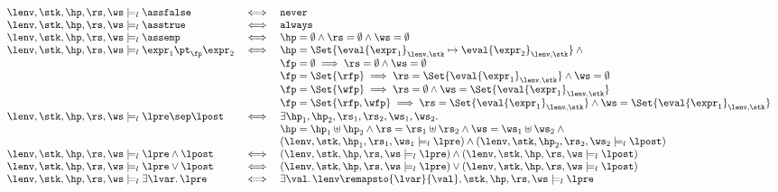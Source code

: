 \[
    \begin{array}{l c l}
        \lenv, \stk, \hp, \rs, \ws \models_{l} \assfalse & \iff & \texttt{never} \\
        \lenv, \stk, \hp, \rs, \ws \models_{l} \asstrue & \iff & \texttt{always} \\
        \lenv, \stk, \hp, \rs, \ws \models_{l} \assemp & \iff & \hp = \emptyset \land \rs = \emptyset \land \ws = \emptyset \\
        \lenv, \stk, \hp, \rs, \ws \models_{l} \expr_{1} \pt_{\fp} \expr_{2} & \iff & \hp = \Set{\eval{\expr_{1}}_{\lenv, \stk} \mapsto \eval{\expr_{2}}_{\lenv, \stk}} \land {} \\
                                                                             & & \fp = \emptyset \implies \rs = \emptyset \land \ws = \emptyset \\
                                                                             & & \fp = \Set{\rfp} \implies \rs = \Set{\eval{\expr_{1}}_{\lenv, \stk}} \land \ws = \emptyset \\
                                                                             & & \fp = \Set{\wfp} \implies \rs = \emptyset \land \ws = \Set{\eval{\expr_{1}}_{\lenv, \stk}}  \\
                                                                             & & \fp = \Set{\rfp,\wfp} \implies \rs = \Set{\eval{\expr_{1}}_{\lenv, \stk}} \land \ws = \Set{\eval{\expr_{1}}_{\lenv, \stk}}  \\
        \lenv, \stk, \hp, \rs, \ws \models_{l} \lpre \sep \lpost & \iff &  \exists \hp_{1}, \hp_{2}, \rs_{1}, \rs_{2}, \ws_{1}, \ws_{2} \ldotp \\
                                                                 & & \hp = \hp_{1} \uplus \hp_{2} \land \rs = \rs_{1} \uplus \rs_{2} \land \ws = \ws_{1} \uplus \ws_{2} \land {} \\
                                                                 & &  ( \lenv, \stk, \hp_{1}, \rs_{1}, \ws_{1} \models_{l} \lpre ) \land ( \lenv, \stk, \hp_{2}, \rs_{2}, \ws_{2} \models_{l} \lpost ) \\
        \lenv, \stk, \hp, \rs, \ws \models_{l} \lpre \land \lpost & \iff & ( \lenv, \stk, \hp, \rs, \ws \models_{l} \lpre ) \land ( \lenv, \stk, \hp, \rs, \ws \models_{l} \lpost ) \\
        \lenv, \stk, \hp, \rs, \ws \models_{l} \lpre \lor \lpost & \iff & ( \lenv, \stk, \hp, \rs, \ws \models_{l} \lpre ) \lor ( \lenv, \stk, \hp, \rs, \ws \models_{l} \lpost ) \\
        \lenv, \stk, \hp, \rs, \ws \models_{l} \exists \lvar \ldotp \lpre & \iff & \exists \val \ldotp \lenv\remapsto{\lvar}{\val}, \stk, \hp, \rs, \ws \models_{l} \lpre \\
    \end{array}
\]

